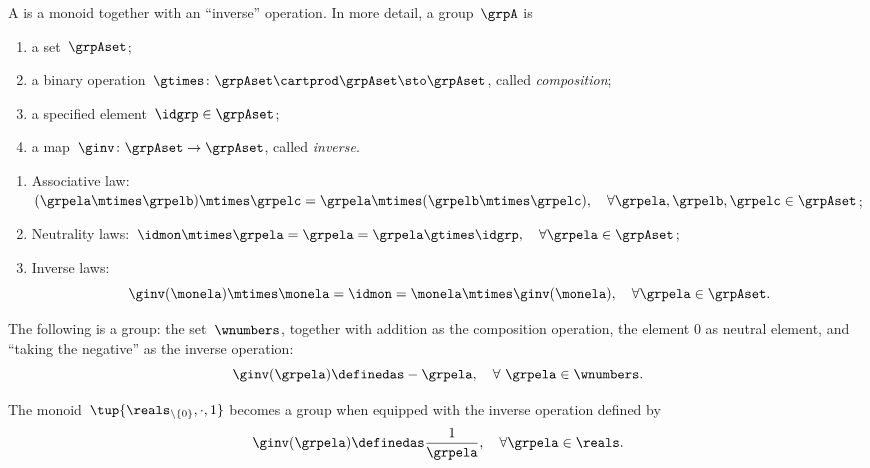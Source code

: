 \begin{ctdefinition}[Group]
    \label{def:group}
    A \emph{} is a monoid together with an ``inverse'' operation.
    In more detail, a group~$\grpA$ is
    \begin{body}
        \constit
        \begin{enumerate}
            \item a set~$\grpAset$;
            \item a binary operation~$\gtimes \colon \grpAset \cartprod \grpAset \sto \grpAset$, called \emph{composition};
            \item a specified element~$\idgrp \in \grpAset$;
            \item a map~$\ginv\colon \grpAset \to \grpAset$, called \emph{inverse}.
        \end{enumerate}
        \condit
        \begin{enumerate}
            \item Associative law:~$(\grpela\mtimes \grpelb)\mtimes \grpelc=\grpela\mtimes (\grpelb\mtimes \grpelc), \quad \forall  \grpela, \grpelb, \grpelc \in \grpAset$;
            \item Neutrality laws:~$\idmon\mtimes \grpela=\grpela=\grpela \gtimes \idgrp, \quad \forall  \grpela \in \grpAset$;
            \item Inverse laws:
                  \begin{equation}
                      \label{eq:group-inverse-law}
                      \ginv(\monela) \mtimes \monela = \idmon = \monela \mtimes \ginv(\monela), \quad \forall  \grpela  \in \grpAset.
                  \end{equation}
        \end{enumerate}
    \end{body}
\end{ctdefinition}
\begin{example}
    The following is a group: the set~$\wnumbers$, together with addition as the composition operation, the element $0$ as neutral element, and ``taking the negative'' as the inverse operation:
    \begin{equation}
        \ginv(\grpela) \definedas -\grpela, \quad \forall \ \grpela \in \wnumbers.
    \end{equation}
\end{example}
\begin{example}
    The monoid~$\tup{\reals_{\backslash \{ 0 \}}, \cdot, 1}$ becomes a group when equipped with the inverse operation defined by
    \begin{equation}
        \ginv(\grpela) \definedas \frac{1}{\grpela}, \quad \forall \grpela \in \reals.
    \end{equation}
\end{example}

